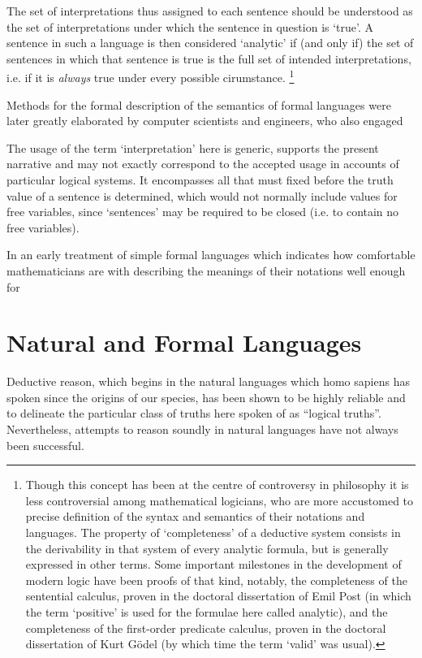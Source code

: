 \documentclass[10pt,titlepage]{article}
\begin{document}
The set of interpretations thus assigned to each sentence should be understood as the set of interpretations under which the sentence in question is `true'.
A sentence in such a language is then considered `analytic' if (and only if) the set of sentences in which that sentence is true is the full set of intended interpretations, i.e. if it is \emph{always} true under every possible cirumstance.
\footnote{
Though this concept has been at the centre of controversy in philosophy it is less controversial among mathematical logicians, who are more accustomed to precise definition of the syntax and semantics of their notations and languages.
The property of `completeness' of a deductive system consists in the derivability in that system of every analytic formula, but is generally expressed in other terms.
Some important milestones in the development of modern logic have been proofs of that kind, notably, the completeness of the sentential calculus, proven in the doctoral dissertation of Emil Post \cite{post21}(in which the term `positive' is used for the formulae here called analytic), and the completeness of the first-order predicate calculus, proven in the doctoral dissertation of Kurt G\"{o}del \cite{godel30} (by which time the term `valid' was usual).
}

Methods for the formal description of the semantics of formal languages were later greatly elaborated by computer scientists and engineers, who also engaged 


The usage of the term `interpretation' here is generic, supports the present narrative and may not exactly correspond to the accepted usage in accounts of particular logical systems.
It encompasses all that must fixed before the truth value of a sentence is determined, which would not normally include values for free variables, since `sentences' may be required to be closed (i.e. to contain no free variables).

In an early treatment of simple formal languages which indicates how comfortable mathematicians are with describing the meanings of their notations well enough for 

\cite{heijenoort67,post21,godel30a,tarski31,tarski56,carnap47}

\section{Natural and Formal Languages}

Deductive reason, which begins in the natural languages which homo sapiens has spoken since the origins of our species, has been shown to be highly reliable and to delineate the particular class of truths here spoken of as ``logical truths''.
Nevertheless, attempts to reason soundly in natural languages have not always been successful.
\end{document}
